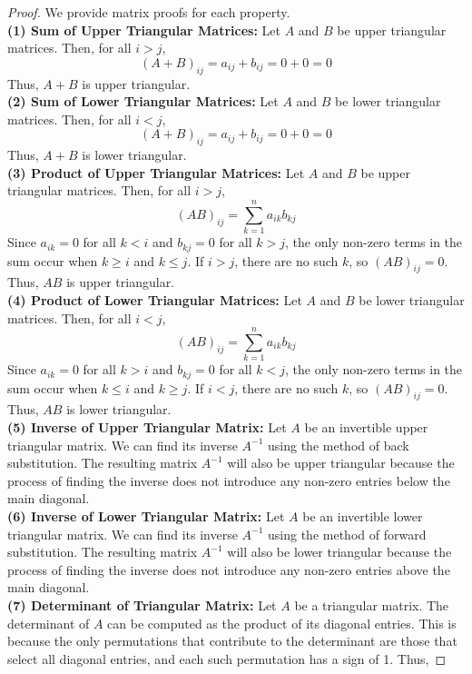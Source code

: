 \documentclass[openany]{book}
\begin{document}
\begin{proof}
    We provide matrix proofs for each property. \\
    \textbf{(1) Sum of Upper Triangular Matrices:} Let $A$ and $B$ be upper triangular matrices. Then, for all $i > j$,
    \[
    (A + B)_{ij} = a_{ij} + b_{ij} = 0 + 0 = 0
    \]
    Thus, $A + B$ is upper triangular. \\
    \textbf{(2) Sum of Lower Triangular Matrices:} Let $A$ and $B$ be lower triangular matrices. Then, for all $i < j$,
    \[
    (A + B)_{ij} = a_{ij} + b_{ij} = 0 + 0 = 0
    \]
    Thus, $A + B$ is lower triangular. \\
    \textbf{(3) Product of Upper Triangular Matrices:} Let $A$ and $B$ be upper triangular matrices. Then, for all $i > j$,
    \[
    (AB)_{ij} = \sum_{k=1}^{n} a_{ik}b_{kj}
    \]
    Since $a_{ik} = 0$ for all $k < i$ and $b_{kj} = 0$ for all $k > j$, the only non-zero terms in the sum occur when $k \geq i$ and $k \leq j$. If $i > j$, there are no such $k$, so $(AB)_{ij} = 0$. Thus, $AB$ is upper triangular. \\
    \textbf{(4) Product of Lower Triangular Matrices:} Let $A$ and $B$ be lower triangular matrices. Then, for all $i < j$,
    \[
    (AB)_{ij} = \sum_{k=1}^{n} a_{ik}b_{kj}
    \]
    Since $a_{ik} = 0$ for all $k > i$ and $b_{kj} = 0$ for all $k < j$, the only non-zero terms in the sum occur when $k \leq i$ and $k \geq j$. If $i < j$, there are no such $k$, so $(AB)_{ij} = 0$. Thus, $AB$ is lower triangular. \\
    \textbf{(5) Inverse of Upper Triangular Matrix:} Let $A$ be an invertible upper triangular matrix. We can find its inverse $A^{-1}$ using the method of back substitution. The resulting matrix $A^{-1}$ will also be upper triangular because the process of finding the inverse does not introduce any non-zero entries below the main diagonal. \\
    \textbf{(6) Inverse of Lower Triangular Matrix:} Let $A$ be an invertible lower triangular matrix. We can find its inverse $A^{-1}$ using the method of forward substitution. The resulting matrix $A^{-1}$ will also be lower triangular because the process of finding the inverse does not introduce any non-zero entries above the main diagonal. \\
    \textbf{(7) Determinant of Triangular Matrix:} Let $A$ be a triangular matrix. The determinant of $A$ can be computed as the product of its diagonal entries. This is because the only permutations that contribute to the determinant are those that select all diagonal entries, and each such permutation has a sign of 1. Thus,

\end{proof}
\end{document}
